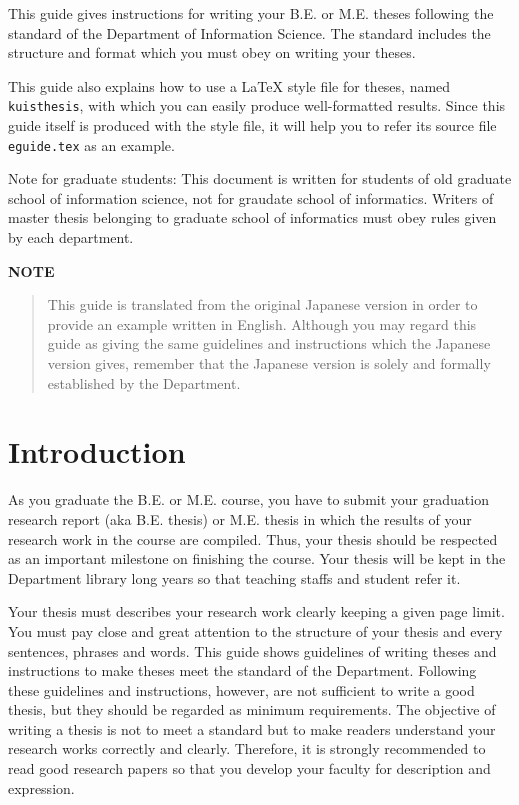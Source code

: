 \documentclass[master,english]{kuisthesis}
\date{February 12th, 2019}
\begin{document}
\maketitle					%

\begin{eabstract}				%
This guide gives instructions for writing your B.E. or M.E. theses following
the standard of the Department of Information Science.  The
standard includes the structure and format which you must obey on writing
your theses.

This guide also explains how to use a \LaTeX{} style file for theses, named
\verb|kuisthesis|, with which you can easily produce well-formatted results.
Since this guide itself is produced with the style file, it will help you to
refer its source file \verb|eguide.tex| as an example.

Note for graduate students: This document is written for students of
old graduate school of information science, not for graudate school of
informatics. Writers of master thesis belonging to graduate school
of informatics must obey rules given by each department.

\par\bigskip\centerline{\bf NOTE}
\begin{quote}
  This guide is translated from the original Japanese version in order
  to provide an example written in English.  Although you may regard
  this guide as giving the same guidelines and instructions which the
  Japanese version gives, remember that the Japanese version is solely
  and formally established by the Department.
\end{quote}
\end{eabstract}



\tableofcontents				%

\section{Introduction}\label{sec-intro}		%
As you graduate the B.E. or M.E. course, you have to submit your graduation
research report (aka B.E. thesis) or M.E. thesis in which the results of
your research work in the course are compiled.  Thus, your thesis should be
respected as an important milestone on finishing the course.  Your thesis
will be kept in the Department library long years so that teaching staffs
and student refer it.

Your thesis must describes your research work clearly keeping a given page
limit.  You must pay close and great attention to the structure of your
thesis and every sentences, phrases and words.  This guide shows guidelines
of writing theses and instructions to make theses meet the standard of the
Department.  Following these guidelines and instructions, however, are not
sufficient to write a good thesis, but they should be regarded as minimum
requirements.  The objective of writing a thesis is not to meet a standard
but to make readers understand your research works correctly and clearly.
Therefore, it is strongly recommended to read good research papers so that
you develop your faculty for description and expression.
\end{document}
